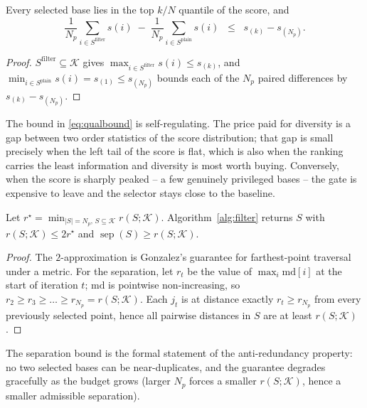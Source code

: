 \begin{proposition}
\label{prop:quality}
Every selected base lies in the top $k/N$ quantile of the score, and
\begin{equation}
  \frac{1}{N_p}\sum_{i\in S^{\mathrm{filter}}}\!\!s(i)
  \;-\;
  \frac{1}{N_p}\sum_{i\in S^{\mathrm{plain}}}\!\!s(i)
  \;\;\le\;\; s_{(k)}-s_{(N_p)} .
  \label{eq:qualbound}
\end{equation}
\end{proposition}
\begin{proof}
$S^{\mathrm{filter}}\subseteq\mathcal{K}$ gives
$\max_{i\in S^{\mathrm{filter}}}s(i)\le s_{(k)}$, and
$\min_{i\in S^{\mathrm{plain}}}s(i)=s_{(1)}\le s_{(N_p)}$ bounds each of the
$N_p$ paired differences by $s_{(k)}-s_{(N_p)}$.
\end{proof}

The bound in \eqref{eq:qualbound} is self-regulating.  The price paid for
diversity is a gap between two order statistics of the score distribution;
that gap is small precisely when the left tail of the score is flat, which is
also when the ranking carries the least information and diversity is most
worth buying.  Conversely, when the score is sharply peaked -- a few
genuinely privileged bases -- the gate is expensive to leave and the selector
stays close to the baseline.

\begin{proposition}
\label{prop:cover}
Let $r^\star=\min_{|S|=N_p,\,S\subseteq\mathcal{K}}r(S;\mathcal{K})$.
Algorithm~\ref{alg:filter} returns $S$ with
$r(S;\mathcal{K})\le 2r^\star$ and
$\operatorname{sep}(S)\ge r(S;\mathcal{K})$.
\end{proposition}
\begin{proof}
The $2$-approximation is Gonzalez's guarantee for farthest-point traversal
under a metric.  For the separation, let $r_t$ be the value of
$\max_i\mathrm{md}[i]$ at the start of iteration $t$; $\mathrm{md}$ is
pointwise non-increasing, so $r_2\ge r_3\ge\dots\ge r_{N_p}=r(S;\mathcal{K})$.
Each $j_t$ is at distance exactly $r_t\ge r_{N_p}$ from every previously
selected point, hence all pairwise distances in $S$ are at least
$r(S;\mathcal{K})$.
\end{proof}

The separation bound is the formal statement of the anti-redundancy property:
no two selected bases can be near-duplicates, and the guarantee degrades
gracefully as the budget grows (larger $N_p$ forces a smaller
$r(S;\mathcal{K})$, hence a smaller admissible separation).

